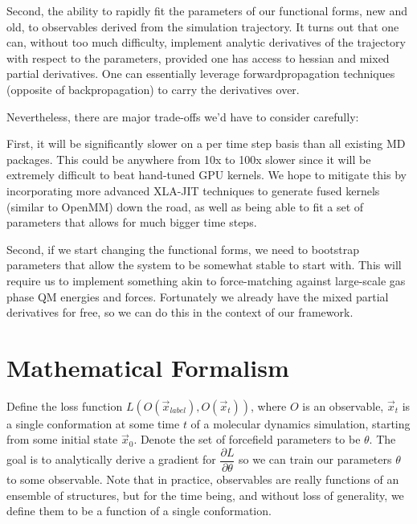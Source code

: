 \documentclass{article}
\begin{document}
Second, the ability to rapidly fit the parameters of our functional forms, new and old, to observables derived from the simulation trajectory. It turns out that one can, without too much difficulty, implement analytic derivatives of the trajectory with respect to the parameters, provided one has access to hessian and mixed partial derivatives. One can essentially leverage forwardpropagation techniques (opposite of backpropagation) to carry the derivatives over.

Nevertheless, there are major trade-offs we'd have to consider carefully:

First, it will be significantly slower on a per time step basis than all existing MD packages. This could be anywhere from 10x to 100x slower since it will be extremely difficult to beat hand-tuned GPU kernels. We hope to mitigate this by incorporating more advanced XLA-JIT techniques to generate fused kernels (similar to OpenMM) down the road, as well as being able to fit a set of parameters that allows for much bigger time steps.

Second, if we start changing the functional forms, we need to bootstrap parameters that allow the system to be somewhat stable to start with. This will require us to implement something akin to force-matching against large-scale gas phase QM energies and forces. Fortunately we already have the mixed partial derivatives for free, so we can do this in the context of our framework.

\section{Mathematical Formalism}


Define the loss function $L(O(\vec{x}_{label}), O(\vec{x}_t))$, where $O$ is an observable, $\vec{x}_t$ is a single conformation at some time $t$ of a molecular dynamics simulation, starting from some initial state $\vec{x}_0$. Denote the set of forcefield parameters to be $\theta$. The goal is to analytically derive a gradient for $\dfrac{\partial L}{\partial \theta}$ so we can train our parameters $\theta$ to some observable. Note that in practice, observables are really functions of an ensemble of structures, but for the time being, and without loss of generality, we define them to be a function of a single conformation.
\end{document}
